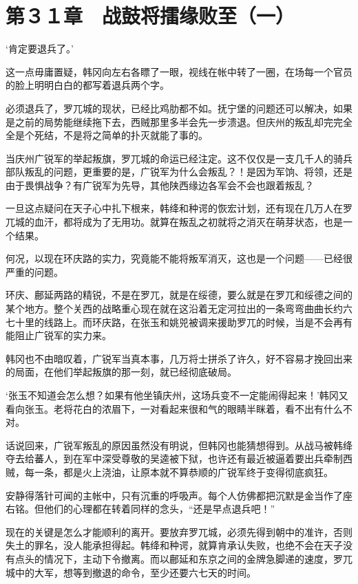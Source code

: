 \section{第３１章　战鼓将擂缘败至（一）}

‘肯定要退兵了。’

这一点毋庸置疑，韩冈向左右各瞟了一眼，视线在帐中转了一圈，在场每一个官员的脸上明明白白的都写着退兵两个字。

必须退兵了，罗兀城的现状，已经比鸡肋都不如。抚宁堡的问题还可以解决，如果是之前的局势能继续拖下去，西贼那里多半会先一步溃退。但庆州的叛乱却完完全全是个死结，不是将之简单的扑灭就能了事的。

当庆州广锐军的举起叛旗，罗兀城的命运已经注定。这不仅仅是一支几千人的骑兵部队叛乱的问题，更重要的是，广锐军为什么会叛乱？！是因为军饷、将领，还是由于畏惧战争？有广锐军为先导，其他陕西缘边各军会不会也跟着叛乱？

一旦这点疑问在天子心中扎下根来，韩绛和种谔的恢宏计划，还有现在几万人在罗兀城的血汗，都将成为了无用功。就算在叛乱之初就将之消灭在萌芽状态，也是一个结果。

何况，以现在环庆路的实力，究竟能不能将叛军消灭，这也是一个问题——已经很严重的问题。

环庆、鄜延两路的精锐，不是在罗兀，就是在绥德，要么就是在罗兀和绥德之间的某个地方。整个关西的战略重心现在就在这沿着无定河拉出的一条弯弯曲曲长约六七十里的线路上。而环庆路，在张玉和姚兕被调来援助罗兀的时候，当是不会再有能阻止广锐军的实力来。

韩冈也不由暗叹着，广锐军当真本事，几万将士拼杀了许久，好不容易才挽回出来的局面，在他们举起叛旗的那一刻，就已经彻底破局。

‘张玉不知道会怎么想？如果有他坐镇庆州，这场兵变不一定能闹得起来！’韩冈又看向张玉。老将花白的浓眉下，一对看起来很和气的眼睛半眯着，看不出有什么不对。

话说回来，广锐军叛乱的原因虽然没有明说，但韩冈也能猜想得到。从战马被韩绛夺去给蕃人，到在军中深受尊敬的吴逵被下狱，也许还有最近被逼着要出兵牵制西贼，每一条，都是火上浇油，让原本就不算恭顺的广锐军终于变得彻底疯狂。

安静得落针可闻的主帐中，只有沉重的呼吸声。每个人仿佛都把沉默是金当作了座右铭。但他们的心理都在转着同样的念头，“还是早点退兵吧！”

现在的关键是怎么才能顺利的离开。要放弃罗兀城，必须先得到朝中的准许，否则失土的罪名，没人能承担得起。韩绛和种谔，就算肯承认失败，也绝不会在天子没有点头的情况下，主动下令撤离。而以鄜延和东京之间的金牌急脚递的速度，罗兀城中的大军，想等到撤退的命令，至少还要六七天的时间。

